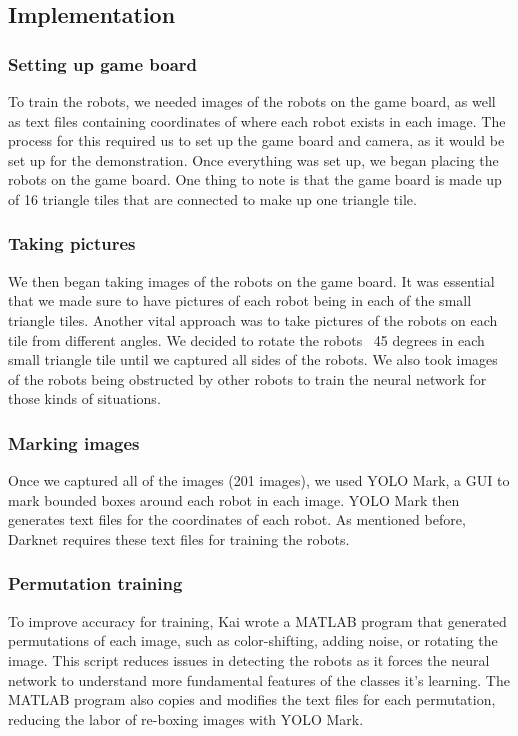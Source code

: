 \documentclass[a4paper,12pt]{article}
\begin{document}
\subsection{Implementation}
	\subsubsection{Setting up game board}
	To train the robots, we needed images of the robots on the game board, as well as text files containing coordinates of where each robot exists in each image. The process for this required us to set up the game board and camera, as it would be set up for the demonstration. Once everything was set up, we began placing the robots on the game board. One thing to note is that the game board is made up of 16 triangle tiles that are connected to make up one triangle tile.
	
	\subsubsection{Taking pictures}
	We then began taking images of the robots on the game board. It was essential that we made sure to have pictures of each robot being in each of the small triangle tiles. Another vital approach was to take pictures of the robots on each tile from different angles. We decided to rotate the robots ~45 degrees in each small triangle tile until we captured all sides of the robots. We also took images of the robots being obstructed by other robots to train the neural network for those kinds of situations.
	
	\subsubsection{Marking images}
	Once we captured all of the images (201 images), we used YOLO Mark, a GUI to mark bounded boxes around each robot in each image. YOLO Mark then generates text files for the coordinates of each robot. As mentioned before, Darknet requires these text files for training the robots.
	
	\subsubsection{Permutation training}
	To improve accuracy for training, Kai wrote a MATLAB program that generated permutations of each image, such as color-shifting, adding noise, or rotating the image. This script reduces issues in detecting the robots as it forces the neural network to understand more fundamental features of the classes it's learning. The MATLAB program also copies and modifies the text files for each permutation, reducing the labor of re-boxing images with YOLO Mark.
\end{document}
